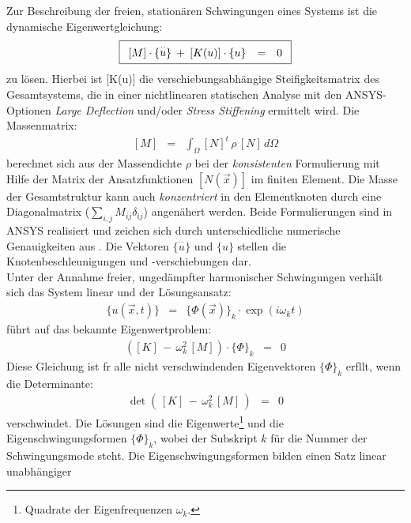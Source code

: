 Zur Beschreibung der freien, stationären Schwingungen eines Systems ist die
dynamische Eigenwertgleichung:
\begin{equation}
\label{modal}
\fbox{$
 \displaystyle
 \begin{array}{rcl}
 [M] \cdot \{\stackrel{\cdot \cdot}{u}\} \: +  \:
 [K(u)] \cdot \{u\} & = & 0
 \end{array}
 $}
\end{equation}
zu lösen. Hierbei ist [K(u)] die verschiebungsabhängige Steifigkeitsmatrix
des Gesamtsystems, die in einer nichtlinearen statischen Analyse mit den
{\sf ANSYS}-Optionen {\em Large Deflection} und/oder {\em Stress Stiffening}
ermittelt wird. Die Massenmatrix:
\begin{eqnarray}
\label{massmatrix}
 [M] & = & \int_{\Omega} [N]^{t} \, \rho \, [N] \, d\Omega
\end{eqnarray}
berechnet sich aus der Massendichte $\rho$ bei der {\em konsistenten}
Formulierung mit Hilfe der Matrix der Ansatzfunktionen $[N(\vec x)]$ im
finiten Element. Die Masse der Gesamtstruktur kann auch {\em konzentriert}
in den Elementknoten durch eine Diagonalmatrix
($\sum_{i,j} M_{ij}\delta_{ij}$)
angenähert werden. Beide Formulierungen sind in {\sf ANSYS} realisiert
und zeichen sich durch unterschiedliche numerische Genauigkeiten aus
\cite{Ram90}.
Die Vektoren $\{\stackrel{\cdot \cdot}{u}\}$ und $\{u\}$ stellen die
Knotenbeschleunigungen und -verschiebungen dar.\\
Unter der Annahme freier,
ungedämpfter harmonischer Schwingungen verhält sich das System linear und
der Lösungsansatz:
\begin{eqnarray}
 \{u(\vec x,t)\} & = & \{ \Phi(\vec x) \}_{k} \cdot \exp (i \omega_{k}t)
\end{eqnarray}
führt auf das bekannte Eigenwertproblem:
\begin{eqnarray}
\label{ewp}
 \left ( [K] \, - \, \omega_{k}^{2} \, [M] \right ) \cdot
 \{ \Phi \}_{k} & = & 0
\end{eqnarray}
Diese Gleichung ist fr alle nicht verschwindenden Eigenvektoren
$\{\Phi\}_{k}$ erfllt, wenn die Determinante:
\begin{eqnarray}
 \det ( \, [K] \, - \,\omega_{k}^{2} \, [M] \,) & = & 0
\end{eqnarray}
verschwindet. Die Lösungen sind die Eigenwerte\footnote{Quadrate der
Eigenfrequenzen $\omega_{k}$.} und die Eigenschwingungsformen
$\{\Phi\}_{k} $, wobei der Subskript $k$ für die Nummer der Schwingungsmode
steht. Die Eigenschwingungsformen bilden einen Satz linear unabhängiger

